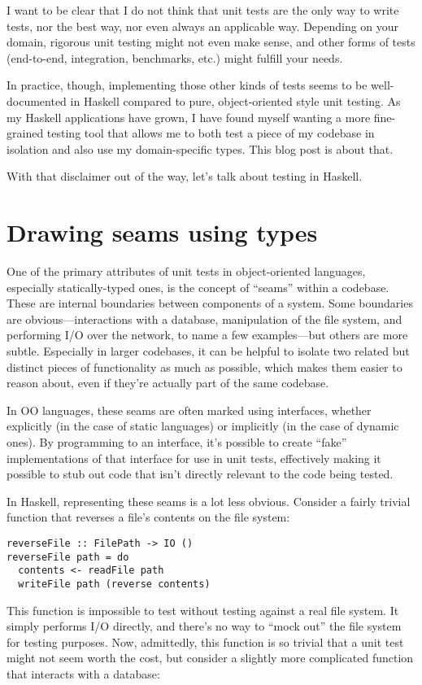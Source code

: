 I want to be clear that I do not think that unit tests are the only way
to write tests, nor the best way, nor even always an applicable way.
Depending on your domain, rigorous unit testing might not even make
sense, and other forms of tests (end-to-end, integration, benchmarks,
etc.) might fulfill your needs.

In practice, though, implementing those other kinds of tests seems to be
well-documented in Haskell compared to pure, object-oriented style unit
testing. As my Haskell applications have grown, I have found myself
wanting a more fine-grained testing tool that allows me to both test a
piece of my codebase in isolation and also use my domain-specific types.
This blog post is about that.

With that disclaimer out of the way, let's talk about testing in
Haskell.

\hypertarget{drawing-seams-using-types}{%
\section{Drawing seams using types}
\label{drawing-seams-using-types}}

One of the primary attributes of unit tests in object-oriented
languages, especially statically-typed ones, is the concept of ``seams''
within a codebase. These are internal boundaries between components of a
system. Some boundaries are obvious---interactions with a database,
manipulation of the file system, and performing I/O over the network, to
name a few examples---but others are more subtle. Especially in larger
codebases, it can be helpful to isolate two related but distinct pieces
of functionality as much as possible, which makes them easier to reason
about, even if they're actually part of the same codebase.

In OO languages, these seams are often marked using interfaces, whether
explicitly (in the case of static languages) or implicitly (in the case
of dynamic ones). By programming to an interface, it's possible to
create ``fake'' implementations of that interface for use in unit tests,
effectively making it possible to stub out code that isn't directly
relevant to the code being tested.

In Haskell, representing these seams is a lot less obvious. Consider a
fairly trivial function that reverses a file's contents on the file
system:

\begin{verbatim}
reverseFile :: FilePath -> IO ()
reverseFile path = do
  contents <- readFile path
  writeFile path (reverse contents)
\end{verbatim}
This function is impossible to test without testing against a real file
system. It simply performs I/O directly, and there's no way to ``mock
out'' the file system for testing purposes. Now, admittedly, this
function is so trivial that a unit test might not seem worth the cost,
but consider a slightly more complicated function that interacts with a
database:

